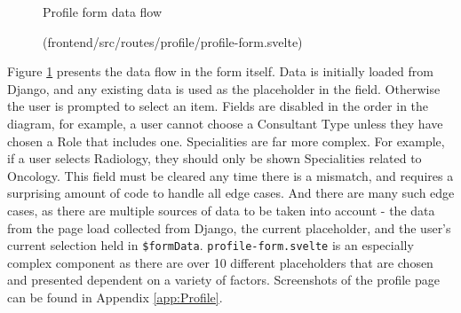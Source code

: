 \begin{figure}[h]
\centering
{}
\vspace{-5pt}
\caption{Profile form data flow}
\vspace{-10pt}
\caption*{(frontend/src/routes/profile/profile-form.svelte)}
\label{fig:profile-form}
\vspace{-5pt}
\end{figure}

Figure \ref{fig:profile-form} presents the data flow in the form itself. Data is initially loaded from Django, and any existing data is used as the placeholder in the field. Otherwise the user is prompted to select an item. Fields are disabled in the order in the diagram, for example, a user cannot choose a Consultant Type unless they have chosen a Role that includes one. Specialities are far more complex. For example, if a user selects Radiology, they should only be shown Specialities related to Oncology. This field must be cleared any time there is a mismatch, and requires a surprising amount of code to handle all edge cases. And there are many such edge cases, as there are multiple sources of data to be taken into account - the data from the page load collected from Django, the current placeholder, and the user's current selection held in \texttt{\$formData}. \texttt{profile-form.svelte} is an especially complex component as there are over 10 different placeholders that are chosen and presented dependent on a variety of factors. Screenshots of the profile page can be found in Appendix \ref{app:Profile}.

